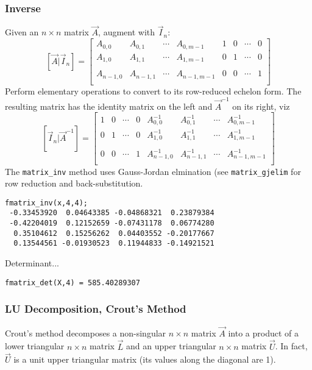 \subsubsection{Inverse}
Given an $n \times n$ matrix $\vec{A}$, augment with $\vec{I}_n$:
\[
    \left[\vec{A}|\vec{I}_n\right] = 
    \left[
    \begin{array}{cccc|cccc}
    A_{0,0}     & A_{0,1}   & \cdots  & A_{0,m-1}   & 1 & 0 & \cdots & 0 \\
    A_{1,0}     & A_{1,1}   & \cdots  & A_{1,m-1}   & 0 & 1 & \cdots & 0 \\
                &           &         &             &   &   &        &   \\
    A_{n-1,0}   & A_{n-1,1} & \cdots  & A_{n-1,m-1} & 0 & 0 & \cdots & 1 \\
    \end{array}
    \right]
\]
Perform elementary operations to convert to its row-reduced echelon form.
The resulting matrix has the identity matrix on the left and $\vec{A}^{-1}$ on
its right, viz
\[
    \left[\vec{I}_n|\vec{A}^{-1}\right] = 
    \left[
    \begin{array}{cccc|cccc}
1 & 0 & \cdots & 0 & A^{-1}_{0,0}   & A^{-1}_{0,1}   & \cdots  & A^{-1}_{0,m-1}   \\
0 & 1 & \cdots & 0 & A^{-1}_{1,0}   & A^{-1}_{1,1}   & \cdots  & A^{-1}_{1,m-1}   \\
  &   &        &   &                &                &         &                  \\
0 & 0 & \cdots & 1 & A^{-1}_{n-1,0} & A^{-1}_{n-1,1} & \cdots  & A^{-1}_{n-1,m-1} \\
    \end{array}
    \right]
\]
The {\tt matrix\_inv} method uses Gauss-Jordan elmination (see 
{\tt matrix\_gjelim} for row reduction and back-substitution.
\begin{verbatim}
fmatrix_inv(x,4,4);
 -0.33453920  0.04643385 -0.04868321  0.23879384
 -0.42204019  0.12152659 -0.07431178  0.06774280
  0.35104612  0.15256262  0.04403552 -0.20177667
  0.13544561 -0.01930523  0.11944833 -0.14921521
\end{verbatim}

Determinant...
\begin{verbatim}
fmatrix_det(X,4) = 585.40289307
\end{verbatim}

\subsubsection{LU Decomposition, Crout's Method}
Crout's method decomposes a non-singular $n\times n$ matrix $\vec{A}$ into a
product of a lower triangular $n \times n$ matrix $\vec{L}$ and an upper
triangular $n \times n$ matrix $\vec{U}$. %
In fact, $\vec{U}$ is a unit upper triangular matrix (its values along the
diagonal are 1).

